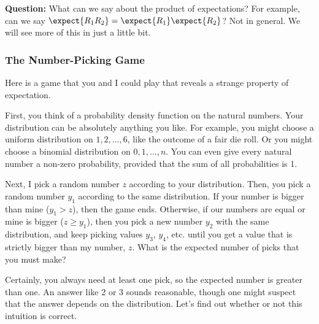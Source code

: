 {\bf Question:} What can we say about the product of expectations?
For example, can we say $\expect{R_1 R_2} = \expect{R_1}
\expect{R_2}$?  Not in general. We will see more of this in just a
little bit.



\subsubsection{The Number-Picking Game}

Here is a game that you and I could play that reveals a strange
property of expectation.

First, you think of a probability density function on the natural
numbers.  Your distribution can be absolutely anything you like.  For
example, you might choose a uniform distribution on $1, 2, \dots, 6$,
like the outcome of a fair die roll.  Or you might choose a binomial
distribution on $0, 1, \dots, n$.  You can even give every natural
number a non-zero probability, provided that the sum of all
probabilities is 1.

Next, I pick a random number $z$ according to your distribution.
Then, you pick a random number $y_1$ according to the same
distribution.  If your number is bigger than mine ($y_1 > z$), then
the game ends.  Otherwise, if our numbers are equal or mine is bigger
($z \geq y_1$), then you pick a new number $y_2$ with the same
distribution, and keep picking values $y_3$, $y_4$, etc. until you get
a value that is strictly bigger than my number, $z$.  What is the
expected number of picks that you must make?

Certainly, you always need at least one pick, so the expected number
is greater than one.  An answer like 2 or 3 sounds reasonable, though
one might suspect that the answer depends on the distribution.  Let's
find out whether or not this intuition is correct.


